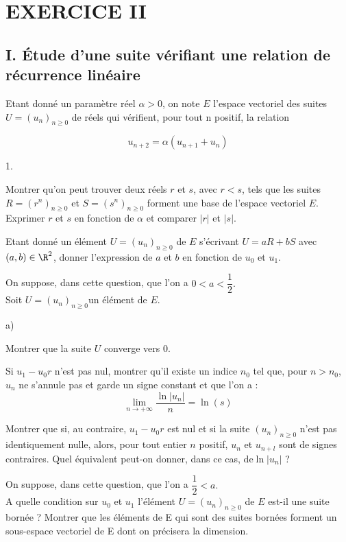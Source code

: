 \documentclass[11pt]{article}%
\begin{document}
\section*{EXERCICE II}

\subsection*{I. Étude d'une suite vérifiant une relation de récurrence
linéaire}

Etant donné un paramètre réel $\alpha >0$, on note $E$ l'espace
vectoriel
des suites $U = (u_{n})_{n\geq 0}$ de réels qui vérifient, pour tout n
positif, la relation

\[
u_{n + 2} = \alpha (u_{n + 1} + u_{n})
\]

\begin{noliste}{1.}
 \setlength{\itemsep}{4mm}
\item Montrer qu'on peut trouver deux réels $r$ et $s$, avec $r<s$,
tels que
les suites $R = (r^{n})_{n\geq 0}$ et $S = (s^{n})_{n\geq 0}$ forment
une base de l'espace vectoriel $E.$ Exprimer $r$ et $s$ en fonction de
$\alpha $ et comparer $\left| r\right| $ et $\left| s\right|. $

\item Etant donné un élément $U = (u_{n})_{n\geq 0}$ de $E $ s'écrivant
$U = aR + bS$ avec $(a,b)\in \R^{2}$, donner l'expression de $a$ et $b$
en fonction de $u_{0}$ et $u_{1}.$

\item On suppose, dans cette question, que l'on a $0<a<\dfrac{1}{2}.$ 
\\
Soit $U = (u_{n})_{n\geq 0}$un élément de $E$.

\begin{noliste}{a)}
 \setlength{\itemsep}{2mm}
\item Montrer que la suite $U$ converge vers $0$.

\item Si $u_{1}-u_{0}r$ n'est pas nul, montrer qu'il existe un indice
$n_{0}$
tel que, pour $n>n_{0}$, $u_{n}$ ne s'annule pas et garde un signe
constant
et que l'on a :
\[
\underset{n\rightarrow + \infty }{\lim }\dfrac{\ln \left|
u_{n}\right| }{n} = \ln (s)
\]

\item Montrer que si, au contraire, $u_{1}-u_{0}r$ est nul et si la
suite $(u_{n})_{n\geq 0}$ n'est pas identiquement nulle, alors, pour
tout
entier $n$ positif, $u_{n}$ et $u_{n + l}$ sont de signes contraires.
Quel équivalent peut-on donner, dans ce cas, de$\ln \left| u_{n}\right|
$ ?
\end{noliste}

\item On suppose, dans cette question, que l'on a $\dfrac{1}{2}<a.$\\
A quelle condition sur $u_{0}$ et $u_{1}$ l'élément $U = (u_{n})_{n\geq

0} $ de $E$ est-il une suite bornée ? Montrer que les éléments de E qui
sont
des suites bornées forment un sous-espace vectoriel de E dont on
précisera
la dimension.
\end{noliste}
\end{document}
